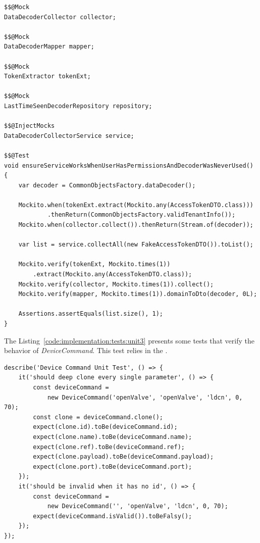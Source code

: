 \begin{lstlisting}[style=Java, caption=Unit Test - Data Decoder Backend Container, label={code:implementation:tests:unit2}]
$$@Mock
DataDecoderCollector collector;

$$@Mock
DataDecoderMapper mapper;

$$@Mock
TokenExtractor tokenExt;

$$@Mock
LastTimeSeenDecoderRepository repository;

$$@InjectMocks
DataDecoderCollectorService service;

$$@Test
void ensureServiceWorksWhenUserHasPermissionsAndDecoderWasNeverUsed() {
    var decoder = CommonObjectsFactory.dataDecoder();

    Mockito.when(tokenExt.extract(Mockito.any(AccessTokenDTO.class)))
            .thenReturn(CommonObjectsFactory.validTenantInfo());
    Mockito.when(collector.collect()).thenReturn(Stream.of(decoder));

    var list = service.collectAll(new FakeAccessTokenDTO()).toList();

    Mockito.verify(tokenExt, Mockito.times(1))
        .extract(Mockito.any(AccessTokenDTO.class));
    Mockito.verify(collector, Mockito.times(1)).collect();
    Mockito.verify(mapper, Mockito.times(1)).domainToDto(decoder, 0L);

    Assertions.assertEquals(list.size(), 1);
}
\end{lstlisting}

The Listing~\ref{code:implementation:tests:unit3} presents some tests that verify the behavior of \textit{DeviceCommand}. This test relies in the .

\begin{lstlisting}[style=javascript, caption=Unit Test - Device Management Frontend Model Library, label={code:implementation:tests:unit3}]
describe('Device Command Unit Test', () => {
    it('should deep clone every single parameter', () => {
        const deviceCommand = 
            new DeviceCommand('openValve', 'openValve', 'ldcn', 0, 70);
        const clone = deviceCommand.clone();
        expect(clone.id).toBe(deviceCommand.id);
        expect(clone.name).toBe(deviceCommand.name);
        expect(clone.ref).toBe(deviceCommand.ref);
        expect(clone.payload).toBe(deviceCommand.payload);
        expect(clone.port).toBe(deviceCommand.port);
    });
    it('should be invalid when it has no id', () => {
        const deviceCommand =
            new DeviceCommand('', 'openValve', 'ldcn', 0, 70);
        expect(deviceCommand.isValid()).toBeFalsy();
    });
});
\end{lstlisting}


